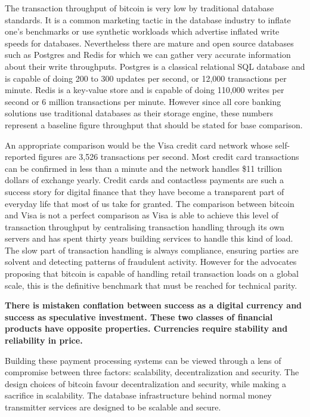The transaction throughput of bitcoin is very low by traditional database
standards. It is a common marketing tactic in the database industry to inflate
one's benchmarks or use synthetic workloads which advertise inflated write
speeds for databases. Nevertheless there are mature and open source databases
such as Postgres and Redis for which we can gather very accurate information
about their write throughputs.  Postgres is a classical relational SQL database
and is capable of doing 200 to 300 updates per second, or 12,000 transactions
per minute. Redis is a key-value store and is capable of doing 110,000 writes
per second or 6 million transactions per minute. However since all core banking
solutions use traditional databases as their storage engine, these numbers
represent a baseline figure throughput that should be stated for base
comparison. \cite{katz_2017}

An appropriate comparison would be the Visa credit card network whose
self-reported figures are 3,526 transactions per second.  Most credit card
transactions can be confirmed in less than a minute and the network handles \$11
trillion dollars of exchange yearly.  Credit cards and contactless payments are
such a success story for digital finance that they have become a transparent
part of everyday life that most of us take for granted. The comparison between
bitcoin and Visa is not a perfect comparison as Visa is able to achieve this
level of transaction throughput by centralising transaction handling through its
own servers and has spent thirty years building services to handle this kind of
load. The slow part of transaction handling is always compliance, ensuring
parties are solvent and detecting patterns of fraudulent activity. However
for the advocates proposing that bitcoin is capable of handling retail
transaction loads on a global scale, this is the definitive benchmark that
must be reached for technical parity.


\begin{infobox}
 \textbf{
    There is mistaken conflation between success as a digital currency and
    success as speculative investment. These two classes of financial products
    have opposite properties. Currencies require stability and reliability in
    price.
  }
\end{infobox}


Building these payment processing systems can be viewed through a lens of
compromise between three factors: scalability, decentralization and security.
The design choices of bitcoin favour decentralization and security, while making
a sacrifice in scalability. The database infrastructure behind normal money
transmitter services are designed to be scalable and secure.

